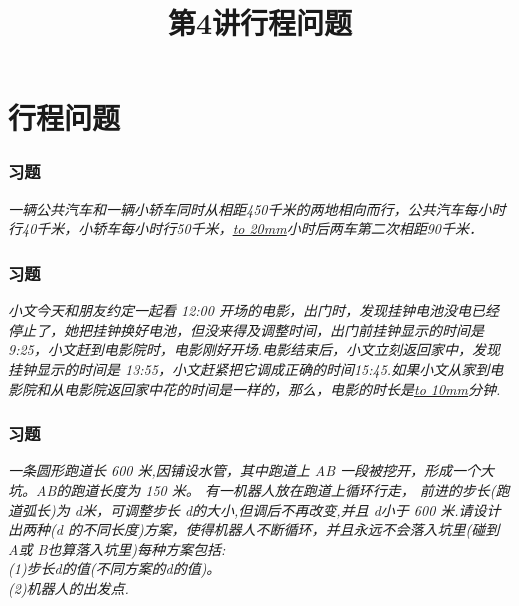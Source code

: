 \section{行程问题}

\title[第4讲\quad 行程问题]{第4讲\quad 行程问题} 
\author{}
\date{}

\begin{frame}
    \titlepage
\end{frame}

\setcounter{framecounter}{0}

\begin{frame}
    \frametitle{习题\theframecounter}
    \vspace*{-3cm}
    \textit{一辆公共汽车和一辆小轿车同时从相距450千米的两地相向而行，公共汽车每小时行40千米，小轿车每小时行50千米，\underline{\hbox to 20mm{}}小时后两车第二次相距90千米．} 
\end{frame}

\begin{frame}
    \frametitle{习题\theframecounter}
    \vspace*{-3cm}
    \textit{小文今天和朋友约定一起看 12:00 开场的电影，出门时，发现挂钟电池没电已经停止了，她把挂钟换好电池，但没来得及调整时间，出门前挂钟显示的时间是 9:25，小文赶到电影院时，电影刚好开场.电影结束后，小文立刻返回家中，发现挂钟显示的时间是 13:55，小文赶紧把它调成正确的时间15:45.如果小文从家到电影院和从电影院返回家中花的时间是一样的，那么，电影的时长是\underline{\hbox to 10mm{}}分钟.}
\end{frame}

\begin{frame}
    \frametitle{习题\theframecounter}
    \vspace*{-1cm}
    \textit{一条圆形跑道长 600 米,因铺设水管，其中跑道上 AB 一段被挖开，形成一个大坑。AB的跑道长度为 150 米。 有一机器人放在跑道上循环行走， 前进的步长(跑道弧长)为 d米，可调整步长 d的大小,但调后不再改变,并且 d小于 600 米.请设计出两种(d 的不同长度)方案，使得机器人不断循环，并且永远不会落入坑里(碰到 A或 B也算落入坑里)每种方案包括:\\
    (1)步长d的值(不同方案的d的值)。\\
    (2)机器人的出发点.}
\end{frame}

